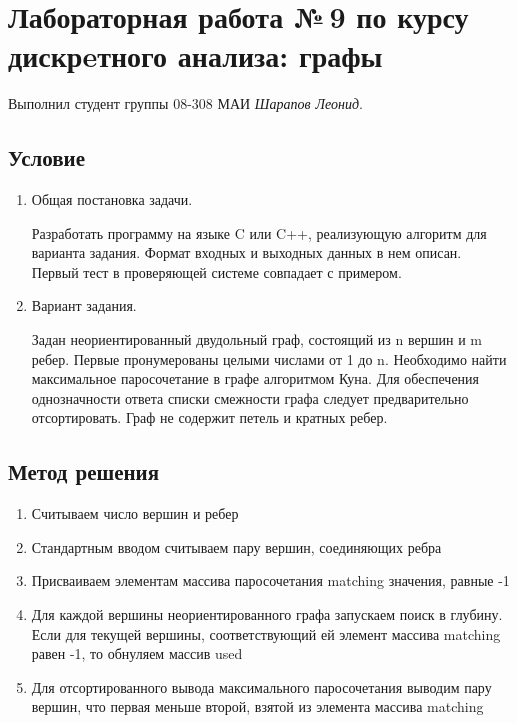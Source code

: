\documentclass[12pt]{article}
\begin{document}
\section*{Лабораторная работа №\,9 по курсу дискрeтного анализа: графы}

Выполнил студент группы 08-308 МАИ \textit{Шарапов Леонид}.

\subsection*{Условие}

\begin{enumerate}
\item Общая постановка задачи.

Разработать программу на языке C или C++, реализующую алгоритм для варианта задания. Формат входных и выходных данных в нем описан. Первый тест в проверяющей системе совпадает с примером.

\item Вариант задания. 

Задан неориентированный двудольный граф, состоящий из n вершин и m ребер. Первые пронумерованы целыми числами от 1 до n. Необходимо найти максимальное паросочетание в графе алгоритмом Куна. Для обеспечения однозначности ответа списки смежности графа следует предварительно отсортировать. Граф не содержит петель и кратных ребер.

\end{enumerate}

\subsection*{Метод решения}

\begin{enumerate}
\item Считываем число вершин и ребер
\item Стандартным вводом считываем пару вершин, соединяющих ребра
\item Присваиваем элементам массива паросочетания matching значения, равные -1
\item Для каждой вершины неориентированного графа запускаем поиск в глубину. Если для текущей вершины, соответствующий ей элемент массива matching равен -1, то обнуляем массив used
\item Для отсортированного вывода максимального паросочетания выводим пару вершин, что первая меньше второй, взятой из элемента массива matching
\end{enumerate}
\end{document}
